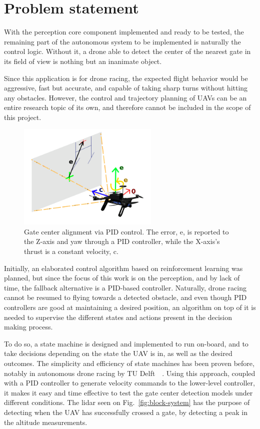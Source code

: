 \section{Problem statement}

With the perception core component implemented and ready to be tested, the
remaining part of the autonomous system to be implemented is naturally the
control logic. Without it, a drone able to detect the center of the nearest
gate in its field of view is nothing but an inanimate object.

Since this application is for drone racing, the expected flight behavior would
be aggressive, fast but accurate, and capable of taking sharp turns without
hitting any obstacles. However, the control and trajectory planning of UAVs can
be an entire research topic of its own, and therefore cannot be included in the
scope of this project.\\

\begin{figure}[h]
	\centering
	\includegraphics[width=0.6\textwidth]{figure/center_alignment.png}
	\caption[Gate center alignment via PID control.]{Gate center alignment via
	PID control. The error, e, is reported to the Z-axis and yaw through a PID
	controller, while the X-axis's thrust is a constant velocity, c.}
\end{figure}

Initially, an elaborated control algorithm based on reinforcement learning was
planned, but since the focus of this work is on the perception, and by lack of
time, the fallback alternative is a PID-based controller. Naturally, drone
racing cannot be resumed to flying towards a detected obstacle, and even though
PID controllers are good at maintaining a desired position, an algorithm on top
of it is needed to supervise the different states and actions present in the
decision making process.

To do so, a state machine is designed and implemented to run on-board, and to
take decisions depending on the state the UAV is in, as well as the desired
outcomes. The simplicity and efficiency of state machines has been proven
before, notably in autonomous drone racing by TU Delft~\etal~\cite{State
Machine based High Level Navigation}. 
Using this approach, coupled with a PID controller to generate velocity
commands to the lower-level controller, it makes it easy and time effective to
test the gate center detection models under different conditions. The lidar
seen on Fig.~\ref{fig:block-system} has the purpose of detecting when the
UAV has successfully crossed a gate, by detecting a peak in the altitude
measurements.\\

